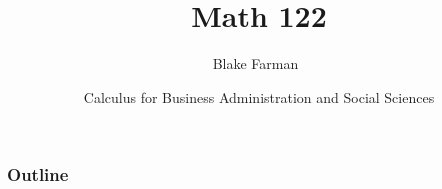 \documentclass{beamer}
\title %
    {Math 122}
\author[Farman]
{Blake Farman~\inst{1}}
\institute[USC]{
\inst{1}
University of South Carolina, Columbia, SC USA}
\date[January 17, 2017]
{Calculus for Business Administration and Social Sciences}
\theoremstyle{definition}
\begin{document}
\begin{frame}
  \titlepage
\end{frame}

\begin{frame}
  \frametitle{Outline}
  \tableofcontents[pausesections]
\end{frame}

\end{document}
